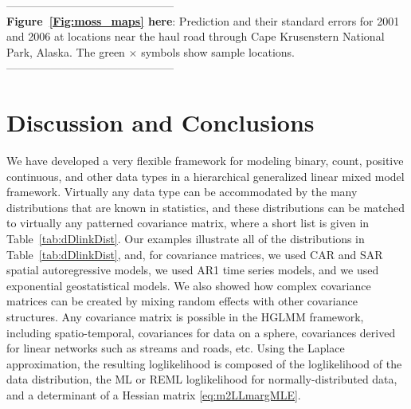 \documentclass[12pt, titlepage]{article}
\begin{document}
\begin{spacing}{0.8}
\vspace{.4cm}
\noindent --------------------------------------------- \\
\textbf{Figure~\ref{Fig:moss_maps} here}: Prediction and their standard errors for 2001 and 2006 at locations near the haul road through Cape Krusenstern National Park, Alaska.  The green $\times$ symbols show sample locations. \\
--------------------------------------------- \\ 
\end{spacing}


\section{Discussion and Conclusions}

We have developed a very flexible framework for modeling binary, count, positive continuous, and other data types in a hierarchical generalized linear mixed model framework.  Virtually any data type can be accommodated by the many distributions that are known in statistics, and these distributions can be matched to virtually any patterned covariance matrix, where a short list is given in Table~\ref{tab:dDlinkDist}. Our examples illustrate all of the distributions in Table~\ref{tab:dDlinkDist}, and, for covariance matrices, we used CAR and SAR spatial autoregressive models, we used AR1 time series models, and we used exponential geostatistical models.  We also showed how complex covariance matrices can be created by mixing random effects with other covariance structures.  Any covariance matrix is possible in the HGLMM framework, including spatio-temporal, covariances for data on a sphere, covariances derived for linear networks such as streams and roads, etc.  Using the Laplace approximation, the resulting loglikelihood is composed of the loglikelihood of the data distribution, the ML or REML loglikelihood for normally-distributed data, and a determinant of a Hessian matrix \eqref{eq:m2LLmargMLE}.
\end{document}
